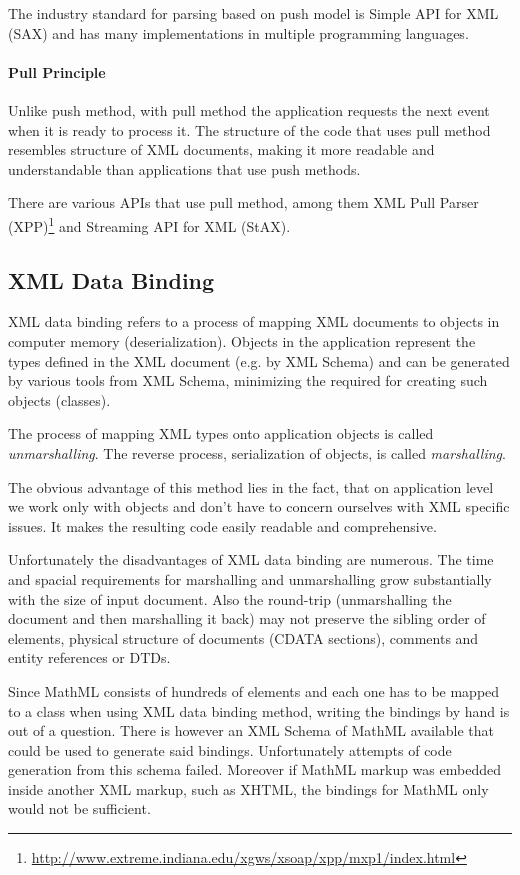 \documentclass[11pt,oneside,final]{fithesis2}
\begin{document}
The industry standard for parsing based on push model is Simple API for XML (SAX) and has many implementations in multiple programming languages.

\paragraph*{Pull Principle} Unlike push method, with pull method the application requests the next event when it is ready to process it. The structure of the code that uses pull method resembles structure of XML documents, making it more readable and understandable than applications that use push methods.

There are various APIs that use pull method, among them XML Pull Parser (XPP)\footnote{\url{http://www.extreme.indiana.edu/xgws/xsoap/xpp/mxp1/index.html}}  and Streaming API for XML (StAX).

\subsection{XML Data Binding} XML data binding refers to a process of mapping XML documents to objects in computer memory (deserialization). Objects in the application represent the types defined in the XML document (e.g. by XML Schema) and can be generated by various tools from XML Schema, minimizing the required for creating such objects (classes). 

The process of mapping XML types onto application objects is called \textit{unmarshalling}. The reverse process, serialization of objects, is called \textit{marshalling}. 

The obvious advantage of this method lies in the fact, that on application level we work only with objects and don't have to concern ourselves with XML specific issues. It makes the resulting code easily readable and comprehensive.

Unfortunately the disadvantages of XML data binding are numerous. The time and spacial requirements for marshalling and unmarshalling grow substantially with the size of input document. Also the round-trip (unmarshalling the document and then marshalling it back) may not preserve the sibling order of elements, physical structure of documents (CDATA sections), comments and entity references or DTDs.

Since MathML consists of hundreds of elements and each one has to be mapped to a class when using XML data binding method, writing the bindings by hand is out of a question. There is however an XML Schema of MathML available that could be used to generate said bindings. Unfortunately attempts of code generation from this schema failed. Moreover if MathML markup was embedded inside another XML markup, such as XHTML, the bindings for MathML only would not be sufficient. 
\end{document}
